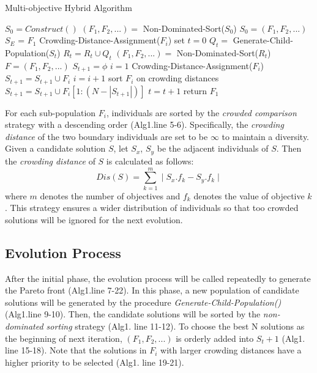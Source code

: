 \begin{algorithm}
\caption{Multi-objective Hybrid Algorithm}
\label{alg1}
\begin{algorithmic} [1]
\State  $S_0 = Construct()$
\State  $(F_1,F_2,...)=$ Non-Dominated-Sort($S_0$)
\State	$S_0 = (F_1,F_2,...)$
\State  $S_E$ = $F_1$
\State Crowding-Distance-Assignment($F_i$)
\EndFor
\State set $t=0$
\State $Q_t=$ Generate-Child-Population($S_t$)
\State $R_t = R_t \cup Q_t$
\State $(F_1,F_2,...)=$ Non-Dominated-Sort($R_t$)
\State $F = (F_1,F_2,...)$
\State $S_{t+1} = \phi $
\State $i=1$
\State Crowding-Distance-Assignment($F_i$)
\State $S_{t+1} = S_{t+1} \cup F_i$
\State $i=i+1$
\EndWhile
\State sort $F_i$ on crowding distances
\State $S_{t+1} = S_{t+1} \cup F_i\left[1:(N-|S_{t+1}|)\right]$
\State $t=t+1$
\EndWhile
\State return $F_1$
\end{algorithmic}
\end{algorithm}

For each sub-population $F_i$, individuals are sorted by the \textit{crowded comparison} strategy with a descending order (Alg1.line 5-6). Specifically, the \textit{crowding distance} of the two boundary individuals are set to be $ \infty $ to maintain a diversity. Given a candidate solution $S$, let $S_x$, $S_y$ be the adjacent individuals of $S$. Then the \emph{crowding distance} of $S$ is calculated as follows:
\begin{equation}
 Dis(S)=\sum^{m}_{k=1}\mid S_x.f_k-S_y.f_k\mid
\end{equation}
 where $m$ denotes the number of objectives and $f_k$ denotes the value of objective $k$. This strategy ensures a wider distribution of individuals so that too crowded solutions will be ignored for the next evolution.

\subsection{Evolution Process}

After the initial phase, the evolution process will be called repeatedly to generate the Pareto front (Alg1.line 7-22). In this phase, a new population of candidate solutions will be generated by the procedure \textit{Generate-Child-Population()} (Alg1.line 9-10). Then, the candidate solutions will be sorted by the \textit{non-dominated sorting} strategy (Alg1. line 11-12). To choose the best N solutions as the beginning of next iteration, $(F_1,F_2,...)$ is orderly added into  $S_t+1$ (Alg1. line 15-18). Note that the solutions in $F_i$ with larger crowding distances have a higher priority to be selected (Alg1. line 19-21).

